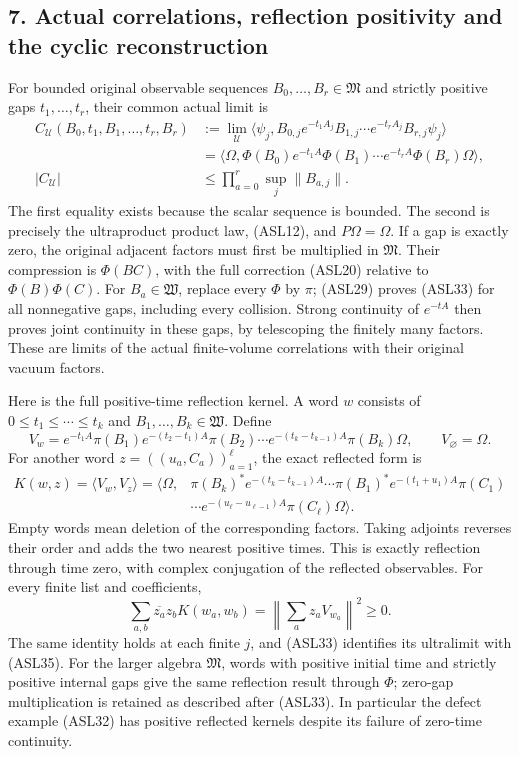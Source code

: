 \documentclass[11pt]{article}
\begin{document}
\subsection*{7. Actual correlations, reflection positivity and the cyclic reconstruction}

For bounded original observable sequences \(B_0,\ldots,B_r\in\mathfrak M\) and strictly positive gaps \(t_1,\ldots,t_r\), their common actual limit is
\[
\begin{aligned}
 C_{\mathcal U}(B_0,t_1,B_1,\ldots,t_r,B_r)
 &:=\lim_{\mathcal U}\langle\psi_j,B_{0,j}e^{-t_1A_j}B_{1,j}
          \cdots e^{-t_rA_j}B_{r,j}\psi_j\rangle\\
 &=\langle\Omega,\Phi(B_0)e^{-t_1A}\Phi(B_1)
           \cdots e^{-t_rA}\Phi(B_r)\Omega\rangle,\\
 |C_{\mathcal U}|&\le\prod_{a=0}^r\sup_j\|B_{a,j}\|.
\end{aligned}\tag{ASL33}
\]
The first equality exists because the scalar sequence is bounded. The second is precisely the ultraproduct product law, (ASL12), and \(P\Omega=\Omega\). If a gap is exactly zero, the original adjacent factors must first be multiplied in \(\mathfrak M\). Their compression is \(\Phi(BC)\), with the full correction (ASL20) relative to \(\Phi(B)\Phi(C)\). For \(B_a\in\mathfrak W\), replace every \(\Phi\) by \(\pi\); (ASL29) proves (ASL33) for all nonnegative gaps, including every collision. Strong continuity of \(e^{-tA}\) then proves joint continuity in these gaps, by telescoping the finitely many factors. These are limits of the actual finite-volume correlations with their original vacuum factors.

Here is the full positive-time reflection kernel. A word \(w\) consists of \(0\le t_1\le\cdots\le t_k\) and \(B_1,\ldots,B_k\in\mathfrak W\). Define
\[
 V_w=e^{-t_1A}\pi(B_1)e^{-(t_2-t_1)A}\pi(B_2)
       \cdots e^{-(t_k-t_{k-1})A}\pi(B_k)\Omega,
 \qquad V_{\varnothing}=\Omega.
 \tag{ASL34}
\]
For another word \(z=((u_a,C_a))_{a=1}^\ell\), the exact reflected form is
\[
\begin{aligned}
 K(w,z)=\langle V_w,V_z\rangle
 =\langle\Omega,&\pi(B_k)^*e^{-(t_k-t_{k-1})A}\cdots
       \pi(B_1)^*e^{-(t_1+u_1)A}\pi(C_1)\\
       &\cdots e^{-(u_\ell-u_{\ell-1})A}\pi(C_\ell)\Omega\rangle.
\end{aligned}\tag{ASL35}
\]
Empty words mean deletion of the corresponding factors. Taking adjoints reverses their order and adds the two nearest positive times. This is exactly reflection through time zero, with complex conjugation of the reflected observables. For every finite list and coefficients,
\[
 \sum_{a,b}\overline{z_a}z_bK(w_a,w_b)
 =\left\|\sum_a z_aV_{w_a}\right\|^2\ge0.
 \tag{ASL36}
\]
The same identity holds at each finite \(j\), and (ASL33) identifies its ultralimit with (ASL35). For the larger algebra \(\mathfrak M\), words with positive initial time and strictly positive internal gaps give the same reflection result through \(\Phi\); zero-gap multiplication is retained as described after (ASL33). In particular the defect example (ASL32) has positive reflected kernels despite its failure of zero-time continuity.
\end{document}
